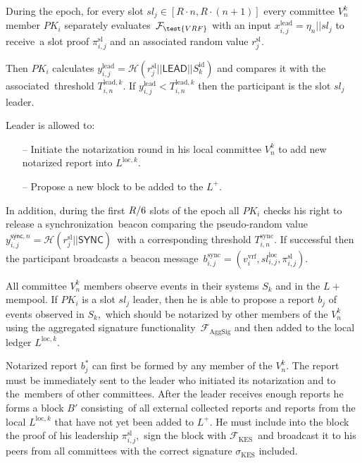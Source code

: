 \begin{legal}
    \item During the epoch, for every slot $sl_j \in [R\cdot n, R\cdot(n+1)]$ every committee $V^k_n$ member $PK_i$ separately evaluates\
    ${\mathcal{F}}_{\test{VRF}}$ with an input ${x_{i, j}^{\text{lead}} = \eta_n || sl_j}$ to receive\
    a slot proof $\pi_{i, j}^{\text{sl}}$ and an associated random value $r_{j}^{\text{sl}}$.

    Then $PK_i$ calculates ${y_{i, j}^{\text{lead}} = \mathcal{H}(r_{j}^{\text{sl}}||\textsf{LEAD}||S_k^{\text{id}})}$ and compares it with the associated\
    threshold $T_{i, n}^{\text{lead}, k}$.
    If $y_{i, j}^{\text{lead}} < T_{i, n}^{\text{lead}, k}$ then the participant is the slot $sl_j$ leader.

    \bigskip
    Leader is allowed to:
    \begin{itemize}
        \item [--] Initiate the notarization round in his local committee $V^k_n$ to add new notarized report into $L^{\text{loc}, k}$.
        \item[--] Propose a new block to be added to the $L^+$.
    \end{itemize}

    \bigskip
    In addition, during the first $R\//6$ slots of the epoch all $PK_i$ checks his right to release a synchronization\
    beacon comparing the pseudo-random value\
    ${y_{i, j}^{\textsf{sync}, n} = \mathcal{H}(r_{j}^{\text{sl}} || \textsf{SYNC})}$\
    with a corresponding threshold $T_{i, n}^{\text{sync}}$.
    If successful then the participant broadcasts a beacon message\
    $b_{i, j}^{\text{sync}} = (v^{\text{vrf}}_i, sl_{i, j}^{\text{loc}}, \pi_{i, j}^{\text{sl}})$.

    \item All committee $V^k_n$ members observe events in their systems $S_k$ and in the $L+$ mempool.
    If $PK_i$ is a slot $sl_j$ leader, then he is able to propose a report $b_j$ of events observed in $S_k$,\
    which should be notarized by other members of the $V^k_n$ using the aggregated signature functionality\
    ${\mathcal{F}}_{\text{AggSig}}$ and then added to the local ledger $L^{\text{loc}, k}$.

    \item Notarized report $b_j^*$ can first be formed by any member of the $V^k_n$.
    The report must be immediately sent to the leader who initiated its notarization and to the\
    members of other committees.
    After the leader receives enough reports he forms a block  $B'$ consisting\
    of all external collected reports and reports from the local $L^{\text{loc}, k}$ that have not yet been added to $L^+$.
    He must include into the block the proof of his leadership $ \pi_{i, j}^{\text{sl}}$,\
    sign the block with ${\mathcal{F}}_{\text{KES}}$\
    and broadcast it to his peers from all committees with the correct signature $\sigma_{\text{KES}}$ included.


\end{legal}
